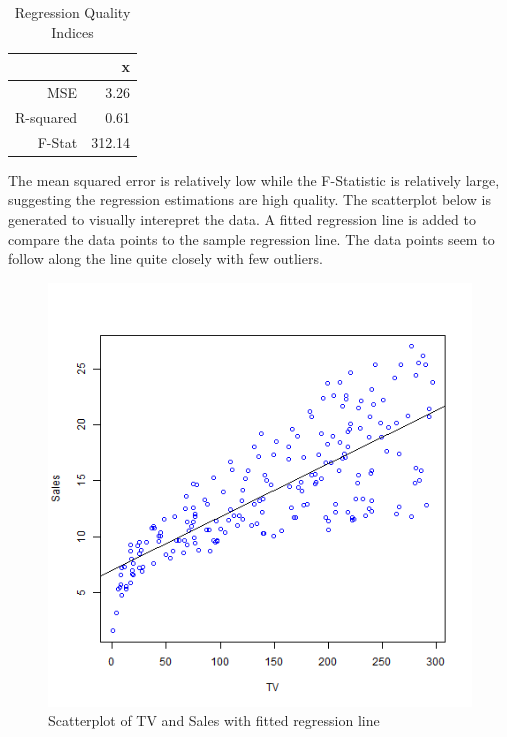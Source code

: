 \documentclass{article}
\begin{document}
\begin{table}[ht]
\centering
\begin{tabular}{rr}
  \hline
 & x \\ 
  \hline
MSE & 3.26 \\ 
  R-squared & 0.61 \\ 
  F-Stat & 312.14 \\ 
   \hline
\end{tabular}
\caption{Regression Quality Indices} 
\label{Result}
\end{table}
The mean squared error is relatively low while the F-Statistic is relatively large, suggesting the regression estimations are high quality. The scatterplot below is generated to visually interepret the data. A fitted regression line is added to compare the data points to the sample regression line. The data points seem to follow along the line quite closely with few outliers.
\begin{figure}
  \caption{Scatterplot of TV and Sales with fitted regression line}
  \centering
    \includegraphics{images/scatterplot-tv-sales.png}
\end{figure}
\end{document}
